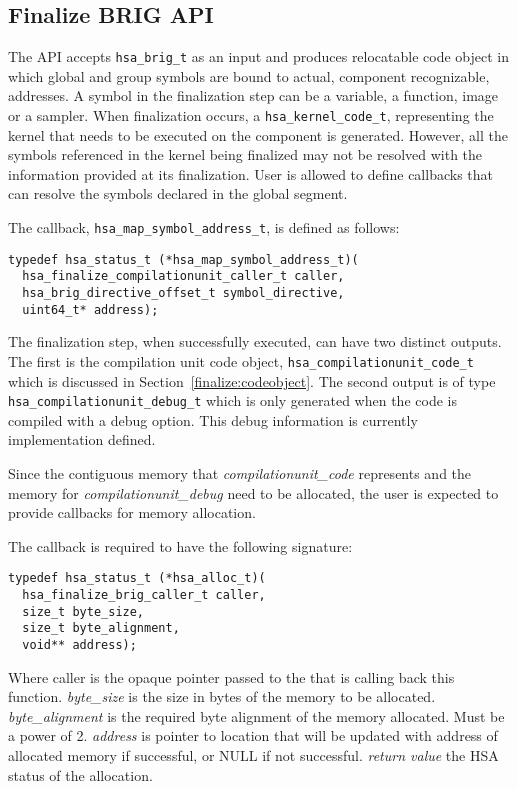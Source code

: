 

\subsection{Finalize BRIG API}
The  API accepts \texttt{hsa\_brig\_t} as
an input and produces relocatable code object in which global and
group symbols are bound to actual, component recognizable,
addresses.  A symbol in the finalization step can be a variable, a
function, image or a sampler. When finalization occurs, a
\texttt{hsa\_kernel\_code\_t}, representing the kernel that needs to
be executed on the component is generated.  However, all the symbols
referenced in the kernel being finalized may not be resolved with
the information provided at its finalization. User is allowed to
define callbacks that can resolve the symbols declared in the global
segment.

The callback, \texttt{hsa\_map\_symbol\_address\_t}, is defined as
follows:
\begin{lstlisting}
typedef hsa_status_t (*hsa_map_symbol_address_t)(
  hsa_finalize_compilationunit_caller_t caller,
  hsa_brig_directive_offset_t symbol_directive,
  uint64_t* address);
\end{lstlisting}

The finalization step, when successfully executed, can have two
distinct outputs. The first is the compilation unit code object,
\texttt{hsa\_compilationunit\_code\_t} which is discussed in
Section~\ref{finalize:codeobject}. The second output is of type
\texttt{hsa\_compilationunit\_debug\_t} which is only generated when
the code is compiled with a debug option. This debug information is
currently implementation defined.

Since the contiguous memory that {\itshape
compilationunit\_code} represents and the memory for {\itshape
compilationunit\_debug} need to be allocated, the user is expected
to provide callbacks for memory allocation. 

The callback is required to have the following signature:

\begin{lstlisting}
typedef hsa_status_t (*hsa_alloc_t)(
  hsa_finalize_brig_caller_t caller,
  size_t byte_size,
  size_t byte_alignment,
  void** address);
\end{lstlisting}

Where
caller is the opaque pointer passed to the
 that is calling back this function.
{\itshape byte\_size} is the size in bytes of the memory to be allocated.
{\itshape byte\_alignment} is the required byte alignment of the memory
allocated. Must be a power of 2.
{\itshape address} is pointer to location that will be updated with address of
allocated memory if successful, or NULL if not successful.
{\itshape return value} the HSA status of the allocation.

